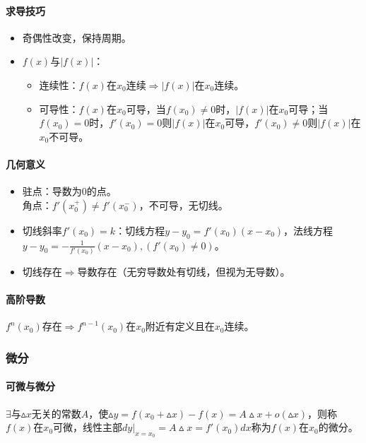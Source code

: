 \documentclass[
12pt, %
a4paper, 
oneside, %
headinclude,footinclude, %
]{scrartcl}
\begin{document}
\paragraph{求导技巧}
\begin{itemize}
\item 奇偶性改变，保持周期。
\item $ f(x) $与$ |f(x)| $：
\begin{itemize}
\item 连续性：$ f(x) $在$ x_0 $连续$ \Rightarrow $$ |f(x)| $在$ x_0 $连续。
\item 可导性：$ f(x) $在$ x_0 $可导，当$ f(x_0) \neq 0 $时，$ |f(x)| $在$ x_0 $可导；当$ f(x_0) = 0 $时，$ f'(x_0) = 0 $则$ |f(x)| $在$ x_0 $可导，$ f'(x_0) \neq 0 $则$ |f(x)| $在$ x_0 $不可导。
\end{itemize}
\end{itemize}
\paragraph{几何意义}
\begin{itemize}
\item 
驻点：导数为$ 0 $的点。\\
角点：$ f'(x_0^+) \neq f'(x_0^-) $，不可导，无切线。
\item 切线斜率$ f'(x_0) = k $：切线方程$ y - y_0 = f'(x_0)(x - x_0) $，法线方程$ y - y_0 = -\frac{1}{f'(x_0)}(x - x_0),(f'(x_0) \neq 0) $。
\item 切线存在$ \Rightarrow $导数存在（无穷导数处有切线，但视为无导数）。
\end{itemize}
\paragraph{高阶导数}
$ f^{n}(x_0) $存在$ \Rightarrow $$ f^{n - 1}(x_0) $在$ x_0 $附近有定义且在$ x_0 $连续。
\subsubsection[微分]{微分}
\paragraph{可微与微分}
$ \exists$与$ \vartriangle x $无关的常数$ A $，使$ \vartriangle y = f(x_0 + \vartriangle x) - f(x) = A \vartriangle x + o(\vartriangle x) $，则称$ f(x) $在$ x_0 $可微，线性主部$ dy|_{x = x_0} = A \vartriangle x = f'(x_0)dx $称为$ f(x) $在$ x_0 $的微分。
\end{document}
